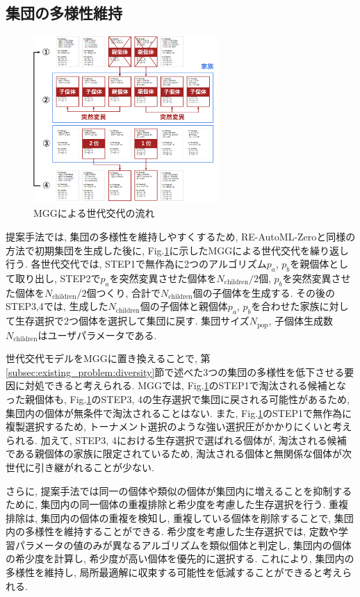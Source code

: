 \documentclass[a4paper,11pt,twocolumn]{jarticle}
\begin{document}
\subsection{集団の多様性維持}

\begin{figure}[tbp]
  \centering
  \includegraphics[width=7cm]{./mgg.png}
  \caption{MGGによる世代交代の流れ}
  \label{fig:mgg}
\end{figure}

提案手法では, 集団の多様性を維持しやすくするため, RE-AutoML-Zeroと同様の方法で初期集団を生成した後に, Fig.\ref{fig:mgg}に示したMGGによる世代交代を繰り返し行う. 各世代交代では, STEP1で無作為に2つのアルゴリズム$p_a$, $p_b$を親個体として取り出し, STEP2で$p_a$を突然変異させた個体を$N_\mathrm{children} / 2$個, $p_b$を突然変異させた個体を$N_\mathrm{children} / 2$個つくり, 合計で$N_\mathrm{children}$個の子個体を生成する. その後のSTEP3,4では, 生成した$N_\mathrm{children}$個の子個体と親個体$p_a$, $p_b$を合わせた家族に対して生存選択で2つ個体を選択して集団に戻す. 集団サイズ$N_\mathrm{pop}$, 子個体生成数$N_\mathrm{children}$はユーザパラメータである.

世代交代モデルをMGGに置き換えることで, 第\ref{subsec:existing_problem:diversity}節で述べた3つの集団の多様性を低下させる要因に対処できると考えられる. MGGでは, Fig.\ref{fig:mgg}のSTEP1で淘汰される候補となった親個体も, Fig.\ref{fig:mgg}のSTEP3, 4の生存選択で集団に戻される可能性があるため, 集団内の個体が無条件で淘汰されることはない. また, Fig.\ref{fig:mgg}のSTEP1で無作為に複製選択するため, トーナメント選択のような強い選択圧がかかりにくいと考えられる. 加えて, STEP3, 4における生存選択で選ばれる個体が, 淘汰される候補である親個体の家族に限定されているため, 淘汰される個体と無関係な個体が次世代に引き継がれることが少ない.

さらに, 提案手法では同一の個体や類似の個体が集団内に増えることを抑制するために, 集団内の同一個体の重複排除と希少度を考慮した生存選択を行う. 重複排除は, 集団内の個体の重複を検知し, 重複している個体を削除することで, 集団内の多様性を維持することができる. 希少度を考慮した生存選択では, 定数や学習パラメータの値のみが異なるアルゴリズムを類似個体と判定し, 集団内の個体の希少度を計算し, 希少度が高い個体を優先的に選択する. これにより, 集団内の多様性を維持し, 局所最適解に収束する可能性を低減することができると考えられる.
\end{document}
